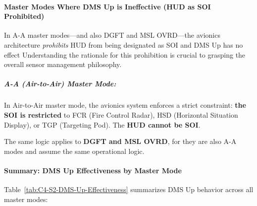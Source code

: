 \documentclass[11pt,a4paper]{article}
\begin{document}
\paragraph*{Master Modes Where DMS Up is Ineffective (HUD as SOI Prohibited)}

In A-A master modes---and also DGFT and MSL OVRD---the avionics architecture \textit{prohibits} HUD from being designated as SOI and DMS Up has no effect Understanding the rationale for this prohibition is crucial to grasping the overall sensor management philosophy.

\subparagraph*{A-A (Air-to-Air) Master Mode:}

In Air-to-Air master mode, the avionics system enforces a strict constraint: \textbf{the SOI is restricted} to FCR (Fire Control Radar), HSD (Horizontal Situation Display), or TGP (Targeting Pod). The \textbf{HUD cannot be SOI}.

The same logic applies to \textbf{DGFT and MSL OVRD}, for they are also A-A modes and assume the same operational logic.

\paragraph*{Summary: DMS Up Effectiveness by Master Mode}

Table~\ref{tab:C4-S2-DMS-Up-Effectiveness} summarizes DMS Up behavior across all master modes:
\end{document}
